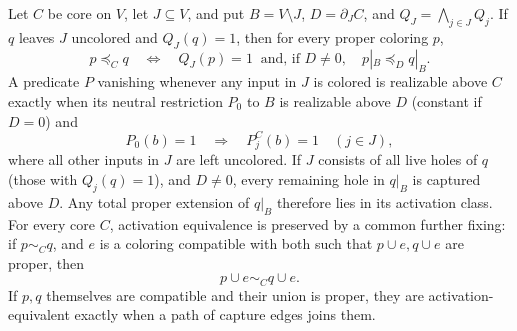 \begin{theorem}
\label{core:thm:activation-common-fixing}
Let $C$ be core on $V$, let $J\subseteq V$, and put
$B=V\setminus J$, $D=\partial_JC$, and $Q_J=\bigwedge_{j\in J}Q_j$.
If $q$ leaves $J$ uncolored and $Q_J(q)=1$, then
for every proper coloring $p$,
\[
 p\preceq_Cq\quad\Longleftrightarrow\quad
 Q_J(p)=1\ \text{ and, if }D\ne0,\quad p|_B\preceq_Dq|_B.
\]
A predicate $P$ vanishing whenever any input in $J$ is colored is
realizable above $C$ exactly when its neutral restriction $P_0$ to $B$
is realizable above $D$ (constant if $D=0$) and
\[
 P_0(b)=1\quad\Longrightarrow\quad
 P_j^C(b)=1\quad(j\in J),
\]
where all other inputs in $J$ are left uncolored.
If $J$ consists of all live holes of $q$ (those with $Q_j(q)=1$),
and $D\ne0$, every remaining hole in $q|_B$ is captured above $D$.
Any total proper extension of $q|_B$ therefore lies in its activation class.
For every core $C$, activation equivalence is preserved by a common
further fixing: if $p\sim_Cq$, and $e$ is a coloring compatible with
both such that $p\cup e,q\cup e$ are proper, then
\[
 p\cup e\sim_Cq\cup e.
\]
If $p,q$ themselves are compatible and their union is proper, they
are activation-equivalent exactly when a path of capture edges joins them.
\end{theorem}
